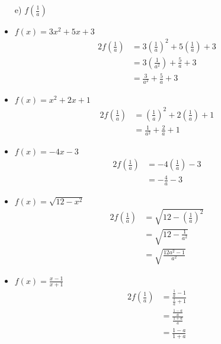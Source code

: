 \documentclass{templateNote}
\begin{document}
\begin{itemize}
    \item[e)] $f(\frac{1}{a})$
    \item $f(x) = 3x^2 + 5x + 3$
    \begin{alignat*}{2}
        f(\frac{1}{a}) &= 3(\frac{1}{a})^2 + 5(\frac{1}{a}) + 3 \\
        &= 3(\frac{1}{a^2}) + \frac{5}{a} + 3 \\
        &= \frac{3}{a^2} + \frac{5}{a} + 3
    \end{alignat*}
    \item $f(x) = x^2 + 2x + 1$
    \begin{alignat*}{2}
        f(\frac{1}{a}) &= (\frac{1}{a})^2 + 2(\frac{1}{a}) + 1 \\
        &= \frac{1}{a^2} + \frac{2}{a} + 1
    \end{alignat*}
    \item $f(x) = -4x - 3$
    \begin{alignat*}{2}
        f(\frac{1}{a}) &= -4(\frac{1}{a}) - 3 \\
        &= -\frac{4}{a} - 3
    \end{alignat*}
    \item $f(x) = \sqrt{12 - x^2}$
    \begin{alignat*}{2}
        f(\frac{1}{a}) &= \sqrt{12 - (\frac{1}{a})^2} \\
        &= \sqrt{12 - \frac{1}{a^2}} \\
        &= \sqrt{\frac{12a^2 - 1}{a^2}}
    \end{alignat*}
    \item $f(x) = \frac{x-1}{x+1}$
    \begin{alignat*}{2}
        f(\frac{1}{a}) &= \frac{\frac{1}{a} - 1}{\frac{1}{a} + 1} \\
        &= \frac{\frac{1 - a}{a}}{\frac{1 + a}{a}} \\
        &= \frac{1 - a}{1 + a}
    \end{alignat*}
\end{itemize}
\end{document}
